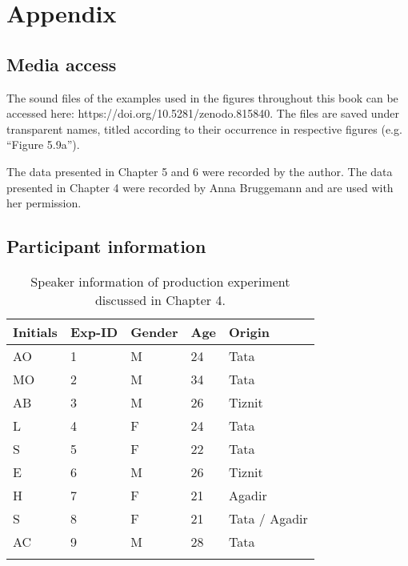 \chapter{Appendix}
\section{Media access}
The sound files of the examples used in the figures throughout this book can be accessed here: https://doi.org/10.5281/zenodo.815840. The files are saved under transparent names, titled according to their occurrence in respective figures (e.g. “Figure 5.9a”).

The data presented in Chapter 5 and 6 were recorded by the author. The data presented in Chapter 4 were recorded by Anna Bruggemann and are used with her permission.

\section{Participant information}
\begin{table}
\caption{Speaker information of production experiment discussed in Chapter 4.}
\label{Table A1}
\begin{tabular}{lllll}
\lsptoprule
\textbf{Initials}                        & \textbf{Exp-ID} & \textbf{Gender} & \textbf{Age} & \textbf{Origin}        \\
\midrule
AO                              & 1      & M      & 24  & Tata          \\
MO                              & 2      & M      & 34  & Tata          \\
AB                              & 3      & M      & 26  & Tiznit        \\
L                               & 4      & F      & 24  & Tata          \\
S                               & 5      & F      & 22  & Tata          \\
E                               & 6      & M      & 26  & Tiznit        \\
H                               & 7      & F      & 21  & Agadir        \\
S                               & 8      & F      & 21  & Tata / Agadir \\
AC                              & 9      & M      & 28  & Tata         \\
\lspbottomrule
\end{tabular}
\end{table}

